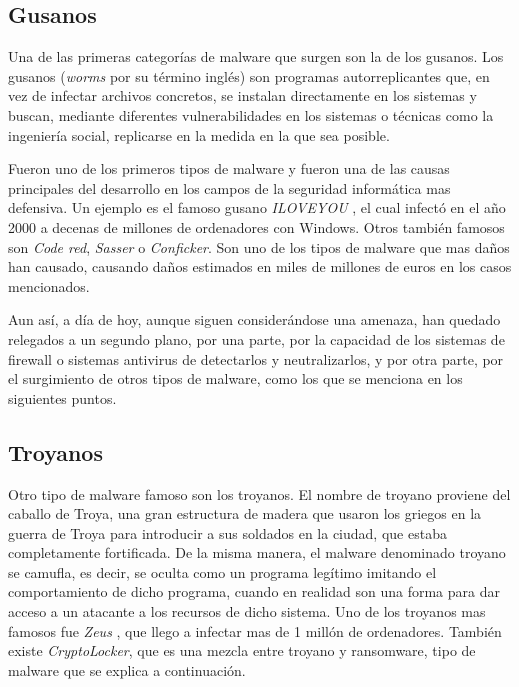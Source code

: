 \subsection{Gusanos}

Una de las primeras categorías de malware que surgen son la de los gusanos. Los gusanos (\textit{worms} por su término inglés) son programas autorreplicantes que, en vez de infectar archivos concretos, se instalan directamente en los sistemas y buscan, mediante diferentes vulnerabilidades en los sistemas o técnicas como la ingeniería social, replicarse en la medida en la que sea posible.

Fueron uno de los primeros tipos de malware y fueron una de las causas principales del desarrollo en los campos de la seguridad informática mas defensiva. Un ejemplo es el famoso gusano \emph{ILOVEYOU} \cite{top-10-viruses}, el cual infectó en el año 2000 a decenas de millones de ordenadores con Windows. Otros también famosos son \emph{Code red}, \emph{Sasser} o \emph{Conficker}. Son uno de los tipos de malware que mas daños han causado, causando daños estimados en miles de millones de euros en los casos mencionados.

Aun así, a día de hoy, aunque siguen considerándose una amenaza, han quedado relegados a un segundo plano, por una parte, por la capacidad de los sistemas de firewall o sistemas antivirus de detectarlos y neutralizarlos, y por otra parte, por el surgimiento de otros tipos de malware, como los que se menciona en los siguientes puntos.

\subsection{Troyanos}

Otro tipo de malware famoso son los troyanos. El nombre de troyano proviene del caballo de Troya, una gran estructura de madera que usaron los griegos en la guerra de Troya para introducir a sus soldados en la ciudad, que estaba completamente fortificada. De la misma manera, el malware denominado troyano se camufla, es decir, se oculta como un programa legítimo imitando el comportamiento de dicho programa, cuando en realidad son una forma para dar acceso a un atacante a los recursos de dicho sistema. Uno de los troyanos mas famosos fue \emph{Zeus} \cite{top-10-viruses}, que llego a infectar mas de 1 millón de ordenadores. También existe \emph{CryptoLocker}, que es una mezcla entre troyano y ransomware, tipo de malware que se explica a continuación.

